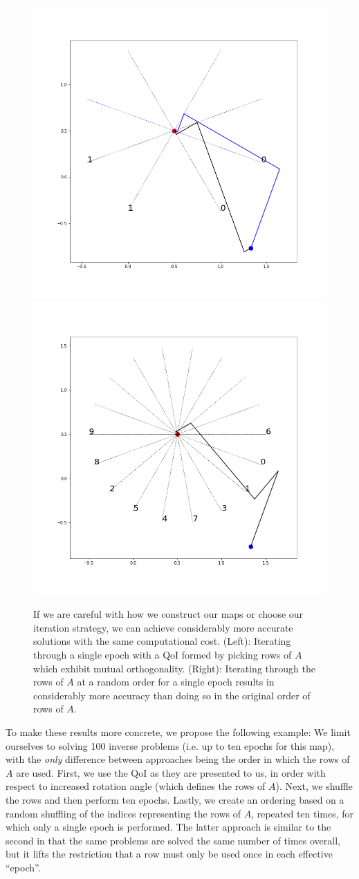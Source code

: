 \begin{figure}
  \centering
  \includegraphics[width=0.475\linewidth]{examples/iterative/10D-firstepoch-pair-smart}
  \includegraphics[width=0.475\linewidth]{examples/iterative/10D-firstepoch-rand}
  \caption{
  If we are careful with how we construct our maps or choose our iteration strategy, we can achieve considerably more accurate solutions with the same computational cost.
  (Left): Iterating through a single epoch with a QoI formed by picking rows of $A$ which exhibit mutual orthogonality.
  (Right): Iterating through the rows of $A$ at a random order for a single epoch results in considerably more accuracy than doing so in the original order of rows of $A$.
  }
  \label{fig:iterative-linear-demo-smart}
\end{figure}

To make these results more concrete, we propose the following example:
We limit ourselves to solving 100 inverse problems (i.e. up to ten epochs for this map), with the \emph{only} difference between approaches being the order in which the rows of $A$ are used.
First, we use the QoI as they are presented to us, in order with respect to increased rotation angle (which defines the rows of $A$).
Next, we shuffle the rows and then perform ten epochs.
Lastly, we create an ordering based on a random shuffling of the indices representing the rows of $A$, repeated ten times, for which only a single epoch is performed.
The latter approach is similar to the second in that the same problems are solved the same number of times overall, but it lifts the restriction that a row must only be used once in each effective ``epoch''.

